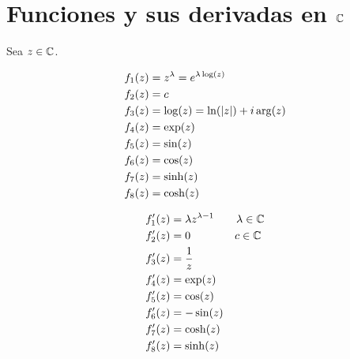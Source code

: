 \section{Funciones y sus derivadas en $\mathbb{C}$}
Sea $z \in \mathbb{C}$.\\
\begin{minipage}{0.5\textwidth}%
    \begin{equation}
        \begin{split}
            f_1(z) &= z^\lambda = e^{\lambda\log(z)}\\
            f_2(z) &= c\\
            f_3(z) &= \log(z) = \ln(\abs{z}) + i\arg(z)\\
            f_4(z) &= \exp(z)\\
            f_5(z) &= \sin(z)\\
            f_6(z) &= \cos(z)\\
            f_7(z) &= \sinh(z)\\
            f_8(z) &= \cosh(z)\\
        \end{split}
        \nonumber
    \end{equation}
\end{minipage}%
\begin{minipage}{0.5\textwidth}%
    \begin{equation}
        \begin{split}
            f_1'(z) &= \lambda z^{\lambda-1}\quad \quad \lambda \in \mathbb{C}\\
            f_2'(z) &= 0\quad \quad \quad \quad c \in \mathbb{C}\\
            f_3'(z) &= \frac{1}{z}\\
            f_4'(z) &= \exp(z)\\
            f_5'(z) &= \cos(z)\\
            f_6'(z) &= -\sin(z)\\
            f_7'(z) &= \cosh(z)\\
            f_8'(z) &= \sinh(z)\\
        \end{split}
        \nonumber
    \end{equation}
\end{minipage}%

\newpage